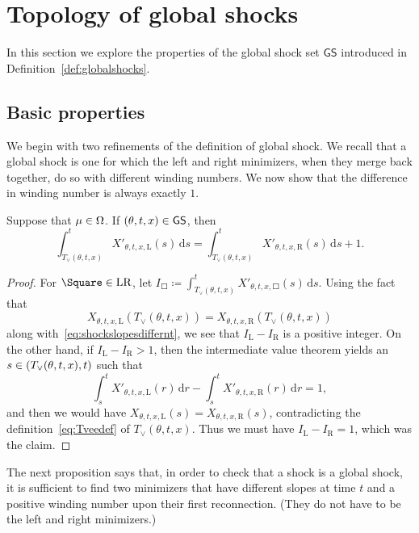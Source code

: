 \documentclass[AHL,Unicode,longabstracts]{cedram}
\newcommand*\GS{\mathsf{GS}}
\newcommand*\dif{\mathrm{d}}
\newcommand*\Left{\mathrm{L}}
\newcommand*\Right{\mathrm{R}}
\newcommand*\LR{\mathrm{LR}}
\let\oldin\in
\renewcommand{\in}{\mathchoice{\oldin}{\oldin}{\,\oldin\,}{\,\oldin\,}}
\begin{document}
\section{Topology of global shocks}
\label{sec:global-shocks}

In this section we explore the properties of the global shock set $\GS$ introduced in Definition~\ref{def:globalshocks}.

\subsection{Basic properties}

We begin with two refinements of the definition of global shock. We recall that a global shock is one for which the left and right minimizers, when they merge back together, do so with different winding numbers. We now show that the difference in winding number is always exactly $1$.

\begin{prop}\label{prop:exactlyoneoff}
Suppose that $\mu\in\Omega$. If $(\theta,t,x)\in\GS$, then
\begin{equation}\label{eq:exactlyoneoff}
\int_{T_{\vee}(\theta,t,x)}^{t}X'_{\theta,t,x,\Left}(s)\,\dif s=\int_{T_{\vee}(\theta,t,x)}^{t}X'_{\theta,t,x,\Right}(s)\,\dif s+1.
\end{equation}
\end{prop}

\begin{proof}
For $\Square\in\LR$, let $I_{\Square}\coloneqq\int_{T_{\vee}(\theta,t,x)}^{t}X'_{\theta,t,x,\Square}(s)\,\dif s$. Using the fact that
\[
X_{\theta,t,x,\Left}(T_{\vee}(\theta,t,x))=X_{\theta,t,x,\Right}(T_{\vee}(\theta,t,x))
\]
along with~\eqref{eq:shockslopesdiffernt}, we see that $I_{\Left}-I_{\Right}$ is a positive integer. On the other hand, if $I_{\Left}-I_{\Right}>1$, then the intermediate value theorem yields an $s\in(T_{\vee}(\theta,t,x),t)$ such that
\[
\int_{s}^{t}X'_{\theta,t,x,\Left}(r)\,\dif r-\int_{s}^{t}X'_{\theta,t,x,\Right}(r)\,\dif r=1,
\]
and then we would have $X_{\theta,t,x,\Left}(s)=X_{\theta,t,x,\Right}(s)$, contradicting the definition~\eqref{eq:Tveedef} of $T_{\vee}(\theta,t,x)$. Thus we must have $I_{\Left}-I_{\Right}=1$, which was the claim.
\end{proof}

The next proposition says that, in order to check that a shock is a global shock, it is sufficient to find two minimizers that have different slopes at time $t$ and a positive winding number upon their first reconnection. (They do not have to be the left and right minimizers.)
\end{document}
